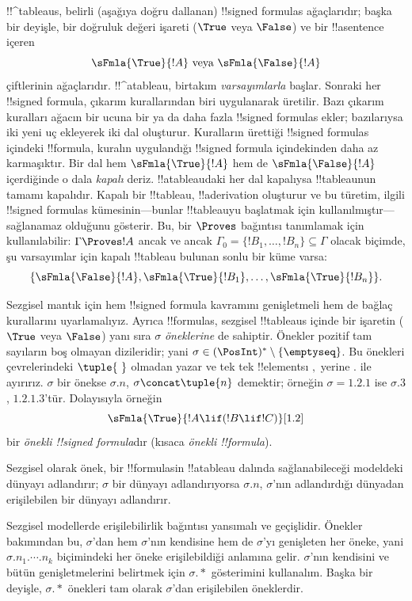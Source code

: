 \documentclass[../../../include/open-logic-section]{subfiles}
\begin{document}


!!^{tableau}s, belirli (aşağıya doğru dallanan) !!{signed formula}s
ağaçlarıdır; başka bir deyişle, bir doğruluk değeri işareti ($\True$ veya
$\False$) ve bir !!a{sentence} içeren
\[
\sFmla{\True}{!A} \text{ veya } \sFmla{\False}{!A}
\]
çiftlerinin ağaçlarıdır. !!^a{tableau}, birtakım \emph{varsayımlarla}
başlar. Sonraki her !!{signed formula}, çıkarım kurallarından biri uygulanarak
üretilir. Bazı çıkarım kuralları ağacın bir ucuna bir ya da daha fazla
!!{signed formula}s ekler; bazılarıysa iki yeni uç ekleyerek iki dal oluşturur.
Kuralların ürettiği !!{signed formula}s içindeki !!{formula}, kuralın
uygulandığı !!{signed formula} içindekinden daha az karmaşıktır. Bir dal hem
$\sFmla{\True}{!A}$ hem de $\sFmla{\False}{!A}$ içerdiğinde o dala
\emph{kapalı} deriz. !!a{tableau}{}daki her dal kapalıysa !!{tableau}{}nun tamamı
kapalıdır. Kapalı bir !!{tableau}, !!a{derivation} oluşturur ve bu türetim,
ilgili !!{signed formula}s kümesinin---bunlar !!{tableau}{}yu başlatmak için
kullanılmıştır---sağlanamaz olduğunu gösterir. Bu, bir $\Proves$ bağıntısı
tanımlamak için kullanılabilir:
$\Gamma \Proves !A$ ancak ve ancak $\Gamma_0 = \{!B_1,
\dots, !B_n\} \subseteq \Gamma$ olacak biçimde, şu varsayımlar için kapalı
!!{tableau} bulunan sonlu bir küme varsa:
\[
\{\sFmla{\False}{!A}, \sFmla{\True}{!B_1}, \dots, \sFmla{\True}{!B_n}\}.
\]

Sezgisel mantık için hem !!{signed formula} kavramını genişletmeli hem de
bağlaç kurallarını uyarlamalıyız. Ayrıca !!{formula}s, sezgisel !!{tableau}s
içinde bir işaretin ($\True$ veya $\False$) yanı sıra $\sigma$
\emph{öneklerine} de sahiptir. Önekler pozitif tam sayıların boş olmayan
dizileridir; yani
$\sigma \in (\PosInt)^* \setminus \{\emptyseq\}$. Bu önekleri çevrelerindeki
$\tuple{\ }$ olmadan yazar ve tek tek !!{element}s{}ı $,$ yerine $.$ ile
ayırırız. $\sigma$ bir önekse $\sigma.n$, $\sigma \concat \tuple{n}$
demektir; örneğin $\sigma = 1.2.1$ ise $\sigma.3$, $1.2.1.3$'tür.
Dolayısıyla örneğin
\[
\sFmla{\True}{!A \lif (!B \lif !C)}[1.2]
\]
bir \emph{önekli !!{signed formula}}dır (kısaca \emph{önekli
  !!{formula}}).

Sezgisel olarak önek, bir !!{formula}s{}in !!a{tableau} dalında
sağlanabileceği modeldeki dünyayı adlandırır; $\sigma$ bir dünyayı
adlandırıyorsa $\sigma.n$, $\sigma$'nın adlandırdığı dünyadan erişilebilen
bir dünyayı adlandırır.

Sezgisel modellerde erişilebilirlik bağıntısı yansımalı ve geçişlidir. Önekler
bakımından bu, $\sigma$'dan hem $\sigma$'nın kendisine hem de $\sigma$'yı
genişleten her öneke, yani $\sigma.n_1.\cdots.n_k$ biçimindeki her öneke
erişilebildiği anlamına gelir. $\sigma$'nın kendisini ve bütün genişletmelerini belirtmek
için $\sigma.*$ gösterimini kullanalım. Başka bir deyişle, $\sigma.*$
önekleri tam olarak $\sigma$'dan erişilebilen öneklerdir.
\end{document}
